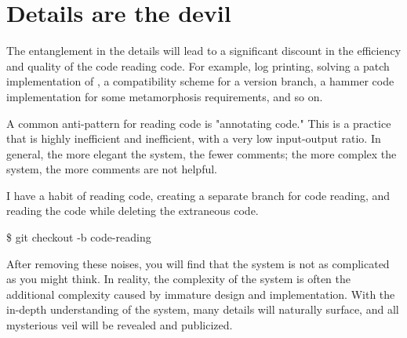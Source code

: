 \section{Details are the devil}
\begin{content}
The entanglement in the details will lead to a significant discount in the efficiency and quality of the code reading code. For example, log printing, solving a patch implementation of , a compatibility scheme for a version branch, a hammer code implementation for some metamorphosis requirements, and so on.

A common anti-pattern for reading code is "annotating code." This is a practice that is highly inefficient and inefficient, with a very low input-output ratio. In general, the more elegant the system, the fewer comments; the more complex the system, the more comments are not helpful.

I have a habit of reading code, creating a separate  branch for code reading, and reading the code while deleting the extraneous code.

\begin{leftbar}
\begin{scala}
\$ git checkout -b code-reading
\end{scala}
\end{leftbar}

After removing these noises, you will find that the system is not as complicated as you might think. In reality, the complexity of the system is often the additional complexity caused by immature design and implementation. With the in-depth understanding of the system, many details will naturally surface, and all mysterious veil will be revealed and publicized.
\end{content}


